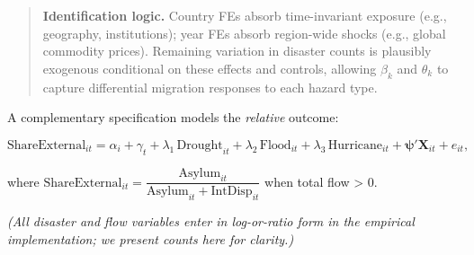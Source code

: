\documentclass[
  11pt,
]{article}
\begin{document}
\begin{quote}
\textbf{Identification logic.} Country FEs absorb time-invariant
exposure (e.g., geography, institutions); year FEs absorb region-wide
shocks (e.g., global commodity prices). Remaining variation in disaster
counts is plausibly exogenous conditional on these effects and controls,
allowing \(\beta_k\) and \(\theta_k\) to capture differential migration
responses to each hazard type.
\end{quote}

A complementary specification models the \emph{relative} outcome:

\[
\text{ShareExternal}_{it}
    = \alpha_i + \gamma_t
    + \lambda_1\,\text{Drought}_{it}
    + \lambda_2\,\text{Flood}_{it}
    + \lambda_3\,\text{Hurricane}_{it}
    + \mathbf{\psi}'\mathbf X_{it}
    + e_{it},
\]

where
\(\text{ShareExternal}_{it} = \dfrac{\text{Asylum}_{it}}{\text{Asylum}_{it} + \text{IntDisp}_{it}}\)
when total flow \textgreater{} 0.

\emph{(All disaster and flow variables enter in log-or-ratio form in the
empirical implementation; we present counts here for clarity.)}
\end{document}
